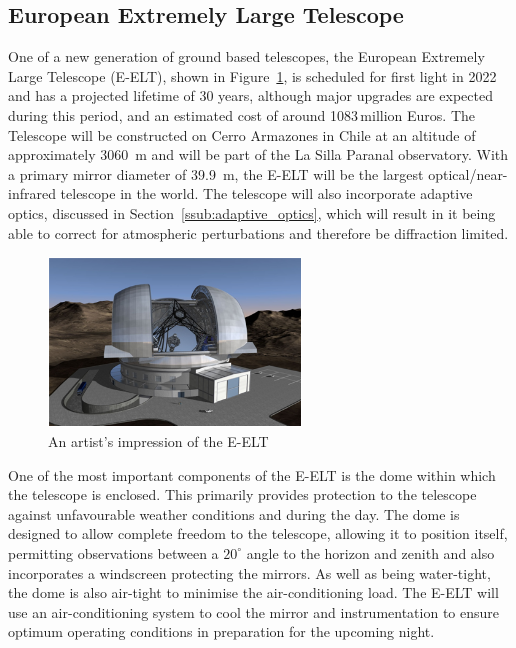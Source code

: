 
\subsection{European Extremely Large Telescope} %
\label{sub:european_extremely_large_telescope}
	One of a new generation of ground based telescopes, the European Extremely Large Telescope (E-ELT), shown in Figure~\ref{fig:artist_eelt}, is scheduled for first light in 2022 and has a projected lifetime of 30 years, although major upgrades are expected during this period\cite[p.~163]{E_ELT_Construction_Proposal}, and an estimated cost of around 1083\,million Euros. The Telescope will be constructed on Cerro Armazones in Chile at an altitude of approximately \SI{3060}{\metre} and will be part of the La Silla Paranal observatory. With a primary mirror diameter of \SI{39.9}{\metre}, the E-ELT will be the largest optical/near-infrared telescope in the world. The telescope will also incorporate adaptive optics, discussed in Section~\ref{ssub:adaptive_optics}, which will result in it being able to correct for atmospheric perturbations and therefore be diffraction limited.
	\begin{figure}[!htbp]
		\centering
		\includegraphics[width=0.6\textwidth]{../Images/E-ELT.png}
		\caption{An artist's impression of the E-ELT\cite{E_ELT_Enclosure}}\label{fig:artist_eelt}
	\end{figure}

	One of the most important components of the E-ELT is the dome within which the telescope is enclosed. This primarily provides protection to the telescope against unfavourable weather conditions and during the day. The dome is designed to allow complete freedom to the telescope, allowing it to position itself, permitting observations between a $20^{\circ}$ angle to the horizon and zenith and also incorporates a windscreen protecting the mirrors. As well as being water-tight, the dome is also air-tight to minimise the air-conditioning load. The E-ELT will use an air-conditioning system to cool the mirror and instrumentation to ensure optimum operating conditions in preparation for the upcoming night.

